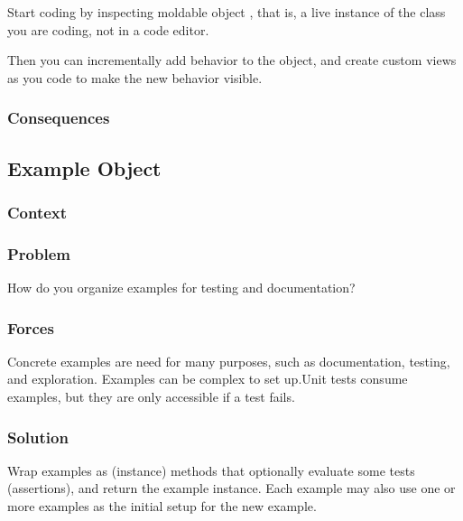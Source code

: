 \documentclass[sigconf]{acmart}
\begin{document}
Start coding by inspecting moldable object , that is, a live instance of the class you are coding, not in a code editor.

Then you can incrementally add behavior to the object, and create custom views as you code to make the new behavior visible.



\subsubsection*{Consequences}

\subsection*{Example Object}\label{pat:exampleObject}


\subsubsection*{Context}
\subsubsection*{Problem}

How do you organize examples for testing and documentation?

\subsubsection*{Forces}

Concrete examples are need for many purposes, such as documentation, testing, and exploration.
Examples can be complex to set up.Unit tests consume examples, but they are only accessible if a test fails.

\subsubsection*{Solution}

Wrap examples as (instance) methods that optionally evaluate some tests (assertions), and return the example instance. Each example may also use one or more examples as the initial setup for the new example.
\end{document}
